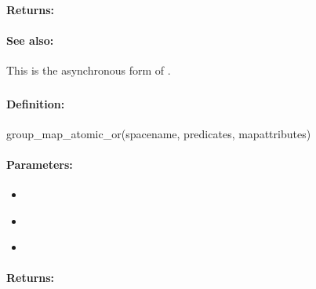 \paragraph{Returns:}


\paragraph{See also:}  This is the asynchronous form of .

\pagebreak
\subsubsection{}
\label{api:ruby:group_map_atomic_or}


\paragraph{Definition:}
\begin{rubycode}
group_map_atomic_or(spacename, predicates, mapattributes)
\end{rubycode}

\paragraph{Parameters:}
\begin{itemize}[noitemsep]
\item {}\\

\item {}\\

\item {}\\

\end{itemize}

\paragraph{Returns:}


\pagebreak
\subsubsection{}
\label{api:ruby:async_group_map_atomic_or}


